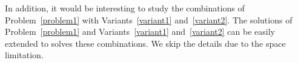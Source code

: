 In addition, it would be interesting to study the combinations of
Problem~\ref{problem1} with Variants~\ref{variant1} and~\ref{variant2}.
The solutions of Problem~\ref{problem1} and Variants~\ref{variant1} and~\ref{variant2}
can be easily extended to solves these combinations.
We skip the details due to the space limitation. 